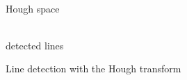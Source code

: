 \documentclass[12pt,a4paper,oneside,openright]{book}
\newcommand{\rarr}{\ding{224}} %
\begin{document}
\begin{CJK}{UTF8}{}
\begin{figure}[htbp]
\begin{center}
\begin{minipage}[c]{.29\textwidth}
\begin{center}
        \\
        Hough space
      \end{center}
    \end{minipage}
    {\Huge\rarr}
    \begin{minipage}[c]{.29\textwidth}
      \begin{center}
        \\
        detected lines
      \end{center}
    \end{minipage}
    \caption{Line detection with the Hough transform\label{fig:hough1}}
  \end{center}
\end{figure}


\end{CJK}
\end{document}

